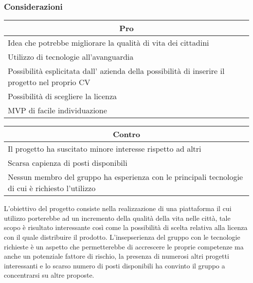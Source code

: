 \subsubsection{Considerazioni}
\begin{minipage}[t]{0.45\linewidth}
    \vspace{0pt}
    {\renewcommand{\arraystretch}{1.5}
    \begin{tabular}{p{1\linewidth}}
        \multicolumn{1}{c}{\textbf{Pro}} \\
        \midrule
        Idea che potrebbe  migliorare la qualità di vita dei cittadini \\
        Utilizzo di tecnologie all'avanguardia \\
        Possibilità esplicitata dall' azienda della possibilità di inserire il progetto nel proprio CV \\
        Possibilità di scegliere la licenza \\
        MVP di facile individuazione \\
        \hline
    \end{tabular}
    }
\end{minipage}
\hspace{0.05\linewidth}
\begin{minipage}[t]{0.45\linewidth}
    \vspace{0pt}
    {
    \renewcommand{\arraystretch}{1.5}
    \begin{tabular}{p{1\linewidth}}
        \multicolumn{1}{c}{\textbf{Contro}} \\
        \midrule
        Il progetto ha suscitato minore interesse rispetto ad altri \\
        Scarsa capienza di posti disponibili \\
        Nessun membro del gruppo ha esperienza con le principali tecnologie di cui è richiesto l'utilizzo \\
        \hline
    \end{tabular}
    }
\end{minipage}
\vspace{1em}

L'obiettivo del progetto consiste nella realizzazione di una piattaforma il cui utilizzo porterebbe ad un incremento della qualità della vita nelle città, tale scopo è risultato interessante così come la possibilità di scelta relativa alla licenza con il quale distribuire il prodotto.
L'insepserienza del gruppo con le tecnologie richieste è un aspetto che permetterebbe di accrescere le proprie competenze ma anche un potenziale fattore di rischio, la presenza di numerosi altri progetti interessanti e lo scarso numero di posti disponibili ha convinto il gruppo a concentrarsi su altre proposte. 